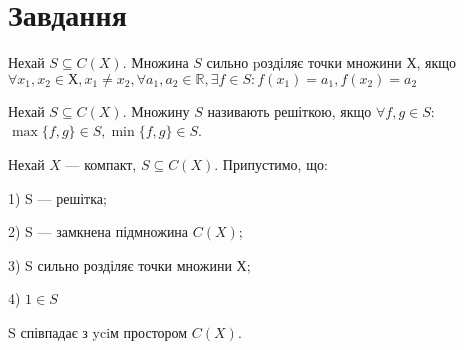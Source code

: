 
\chapter{Завдання \theHchapter}

\begin{tcolorbox}[title=Означення 1]
    Нехай $S \subseteq C(X)$. 
    Множина $S$ сильно pозділяє точки множини $Х$, якщо
    $\forall x_1, x_2 \in Х, x_1 \neq x_2, \forall a_1, a_2 \in \mathbb{R},
    \exists f \in S: f(x_1) = a_1, f(x_2) = a_2$
\end{tcolorbox}

\begin{tcolorbox}[title=Означення 2]
    Нехай $S \subseteq C(X)$. Множину $S$ називають решіткою, 
    якщо $\forall f, g \in S$:
    $\max\{f,g\} \in S, \min\{f,g\} \in S$.
\end{tcolorbox}


\begin{tcolorbox}[title=теорема Какутанi–Крейна.]
    Нехай $X$ — компакт, $S \subseteq C(X)$. Припустимо, що:


    1) S — решітка;
    
    
    2) S — замкнена підмножина $C(X)$;
    
    
    3) S сильно розділяє точки множини Х;
    
    
    4) $1 \in S$
    
    
    S співпадає з yciм простором $C(X)$.
\end{tcolorbox}

